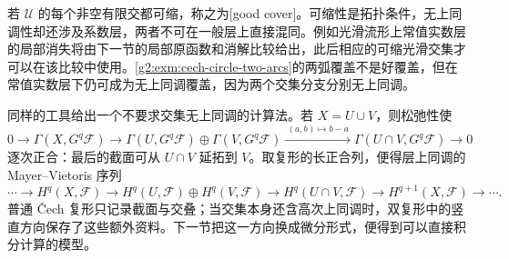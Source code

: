 若 \(\mathcal U\) 的每个非空有限交都可缩，称之为[good cover]。可缩性是拓扑条件，无上同调性却还涉及系数层，两者不可在一般层上直接混同。例如光滑流形上常值实数层的局部消失将由下一节的局部原函数和消解比较给出，此后相应的可缩光滑交集才可以在该比较中使用。\cref{g2:exm:cech-circle-two-arcs}的两弧覆盖不是好覆盖，但在常值实数层下仍可成为无上同调覆盖，因为两个交集分支分别无上同调。

同样的工具给出一个不要求交集无上同调的计算法。若 \(X=U\cup V\)，则松弛性使
\[
	0\to\Gamma(X,G^q\mathcal F)\to\Gamma(U,G^q\mathcal F)\oplus\Gamma(V,G^q\mathcal F)
	\xrightarrow{\ (a,b)\mapsto b-a\ }\Gamma(U\cap V,G^q\mathcal F)\to0
\]
逐次正合：最后的截面可从 \(U\cap V\) 延拓到 \(V\)。取复形的长正合列，便得层上同调的 Mayer--Vietoris 序列
\[
	\cdots\to H^q(X,\mathcal F)\to H^q(U,\mathcal F)\oplus H^q(V,\mathcal F)
	\to H^q(U\cap V,\mathcal F)\to H^{q+1}(X,\mathcal F)\to\cdots.
\]
普通 Čech 复形只记录截面与交叠；当交集本身还含高次上同调时，双复形中的竖直方向保存了这些额外资料。下一节把这一方向换成微分形式，便得到可以直接积分计算的模型。
